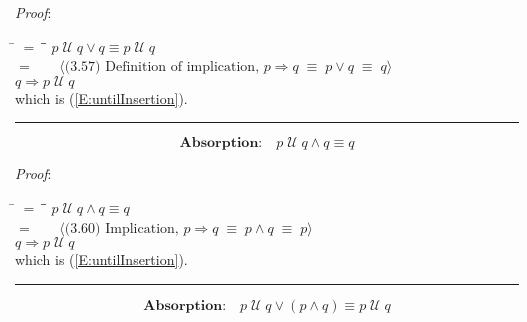 \documentclass[12pt, fleqn, leqno]{article}
\newcommand{\lgap}{2pt}                             %
\newcommand{\mymathindent}{24pt}                    %
\newcommand{\equivs}{\ensuremath{\;\equiv\;}}       %
\newcommand{\impl}{\ensuremath{\Rightarrow}}        %
\newcommand{\Until}{\;\mathcal{U}\;}
\newcommand{\Next}{\;\,\text{\raisebox{3.5pt}{\circle{6}}}}
\newcommand{\myqed}{\rule[-.23ex]{1.2ex}{2.0ex}}
\newcommand{\myqedtab}{\hspace{384pt}}              %
\newcommand{\Gll} {\langle}                         %
\newcommand{\Ggg} {\rangle}                         %
\newcommand{\Hint}[1]     {\ \ \ $\Gll              \mbox{#1} \Ggg$ }   %
\begin{document}
\emph{Proof}:
\begin{tabbing}
\hspace{\mymathindent} \= $= \;$ \= \myqedtab \= \kill
  \> \>   $p \Until q \lor q \equiv p \Until q$\\[\lgap]
 \> $=$ \> \Hint{(3.57) Definition of implication, $p\impl q\equivs p\lor q \equivs q$} \\[\lgap]
  \> \>   $q \impl p \Until q$\\[\lgap]
  \> which is (\ref{E:untilInsertion}). \quad \myqed
\end{tabbing}

\begin{equation}\label{E:untilAndQ}
\textbf{Absorption:}\quad p \Until q \land q \equiv q
\end{equation}

\emph{Proof}:
\begin{tabbing}
\hspace{\mymathindent} \= $= \;$ \= \myqedtab \= \kill
  \> \>   $p \Until q \land q \equiv q$\\[\lgap]
\> $=$  \>  \Hint{(3.60) Implication, $p\impl q \equivs p\land q \equivs p$}\\[\lgap]
  \> \>   $q \impl p \Until q$\\[\lgap]
  \> which is (\ref{E:untilInsertion}). \quad \myqed
\end{tabbing}
\begin{equation}\label{E:untilOrAnd}
\textbf{Absorption:}\quad p \Until q \lor (p \land q) \equiv p \Until q
\end{equation}
\end{document}
